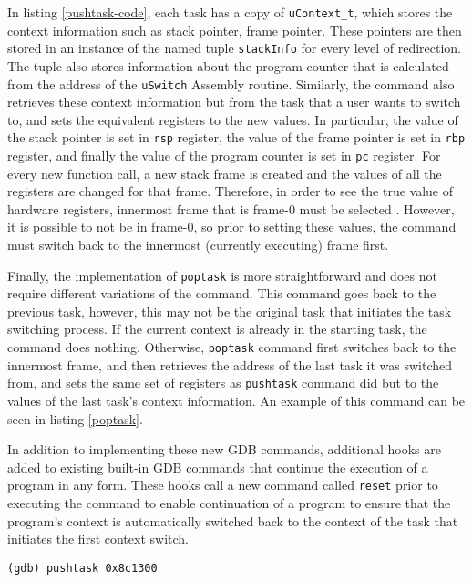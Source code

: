 In listing \ref{pushtask-code}, each task has a copy of \verb|uContext_t|, which stores the context
information such as stack pointer, frame pointer. These pointers are then
stored in an instance of the named tuple \verb|stackInfo| for every level of
redirection. The tuple also stores information about the program counter that
is calculated from the address of the \verb|uSwitch| Assembly routine. Similarly, the command
also retrieves these context information but from the task that a user wants to switch to, and
sets the equivalent registers to the new values. In particular, the value of the stack
pointer is set in \verb|rsp| register, the value of the frame pointer is set in \verb|rbp|
register, and finally the value of the program counter is set in \verb|pc| register.
For every new function call, a new stack frame is created and the values of all
the registers are changed for that frame. Therefore, in
order to see the true value of hardware registers, innermost frame that is
frame-0 must be selected \cite{reference11}. However, it is possible to not be in frame-0, so prior to setting these values,
the command must switch back to the innermost (currently executing) frame first.

Finally, the implementation of \verb|poptask| is more straightforward and does
not require different variations of the command. This command goes back to the previous task, however, this may not be the original
task that initiates the task switching process. If the current context is
already in the starting task, the command does nothing. Otherwise,
\verb|poptask| command first switches back to the innermost frame, and then
retrieves the
address of the last task it was switched from, and sets the same set of registers as
\verb|pushtask| command did but to the values of the last task's context
information. An example of this command can be seen in listing \ref{poptask}.

In addition to implementing these new GDB commands, additional hooks are added
to existing built-in GDB commands that continue the execution of a program in any form. These hooks
call a new command called \verb|reset| prior to executing the command to enable
continuation of a program to ensure that
the program's context is automatically switched back to the context of the task
that initiates the first
context switch.
\begin{lstlisting}[caption={\text{pushtask} command}, label={pushtask}]
(gdb) pushtask 0x8c1300
\end{lstlisting}

